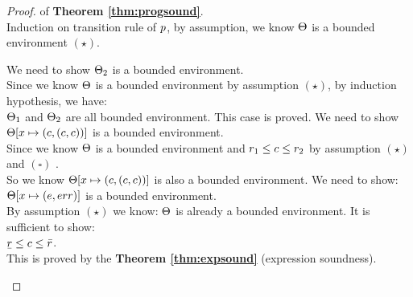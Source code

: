 \documentclass[a4paper,11pt]{article}
\begin{document}
\begin{proof} of \textbf{Theorem \ref{thm:progsound}}.
%
\\
%
Induction on transition rule of $p$, by assumption, we know $\Theta$ is a bounded environment $(\star)$.
\begin{itemize}
	We need to show $\Theta_2$ is a bounded environment.\\
	Since we know $\Theta$ is a bounded environment by assumption $(\star)$, by induction hypothesis, we have:
	\\
	$\Theta_1$ and $\Theta_2$ are all bounded environment. This case is proved.
%
	We need to show $\Theta[x \mapsto (c, (c, c))]$ is a bounded environment.\\
	Since we know $\Theta$ is a bounded environment and $r_1 \leq c \leq r_2$ by assumption $(\star)$ and $(\square)$ .
	\\
	So we know $\Theta[x \mapsto (c, (c, c))]$ is also a bounded environment.
%
	\caseL{\[
	\inferrule*[right = asg]
	{
		\trsenv, \expr \trsto (\fval, (\ubar{\rval}, \bar{\rval}) )
	}
	{
		\trsenv, \varx = \expr
		\trsto
		\trsenv[\varx \mapsto (\fval, (\ubar{\rval}, \bar{\rval}) )]
	}
	\]}
	We need to show: $\Theta[x \mapsto (e, err )]$ is a bounded environment.\\
	By assumption $(\star)$ we know: $\Theta$ is already a bounded environment. It is sufficient to show:\\
	$\ubar{\rval} \leq \fval \leq \bar{\rval}$.\\
	This is proved by the \textbf{Theorem \ref{thm:expsound}} (expression soundness).
\end{itemize}
\end{proof}
%
%
\end{document}
